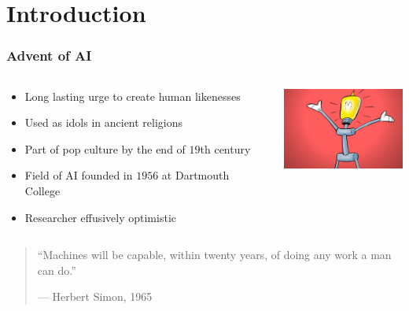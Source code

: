 \section{Introduction}

\begin{frame}
	\frametitle{Advent of AI}
	\begin{columns}
		\begin{column}{7.5cm}
			\begin{itemize}
				\item Long lasting urge to create human likenesses
				\item Used as idols in ancient religions
				\item Part of pop culture by the end of $19$th century
				\item Field of AI founded in $1956$ at Dartmouth College
				\item Researcher effusively optimistic
			\end{itemize}
		\end{column}
		\begin{column}{4cm}
			\includegraphics[width=4cm]{images/littleHelper.jpg}
		\end{column}
	\end{columns}
	\vfill
	\begin{quotation}
		``Machines will be capable, within twenty years, of doing any work a man can do.''\par\raggedleft--- \textup{Herbert Simon, 1965}
	\end{quotation}
\end{frame}

